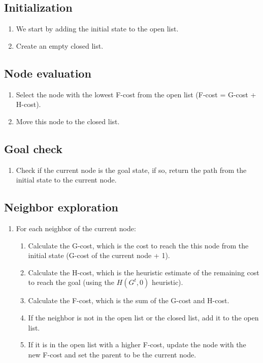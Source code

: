 \subsection{Initialization}
\begin{enumerate}
    \item We start by adding the initial state to the open list.
    \item Create an empty closed list.
\end{enumerate}

\subsection{Node evaluation}
\begin{enumerate}
    \item Select the node with the lowest F-cost from the open list (F-cost = G-cost + H-cost).
    \item Move this node to the closed list.
\end{enumerate}

\subsection{Goal check}
\begin{enumerate}
    \item Check if the current node is the goal state, if so, return the path from the initial state to the current node.
\end{enumerate}

\subsection{Neighbor exploration}
\begin{enumerate}
    \item For each neighbor of the current node:
    \begin{enumerate}
        \item Calculate the G-cost, which is the cost to reach the this node from the initial state (G-cost of the current node + 1).
        \item Calculate the H-cost, which is the heuristic estimate of the remaining cost to reach the goal (using the $H(G^t, 0)$ heuristic).
        \item Calculate the F-cost, which is the sum of the G-cost and H-cost.
        \item If the neighbor is not in the open list or the closed list, add it to the open list.
        \item If it is in the open list with a higher F-cost, update the node with the new F-cost and set the parent to be the current node.
    \end{enumerate}
\end{enumerate}

